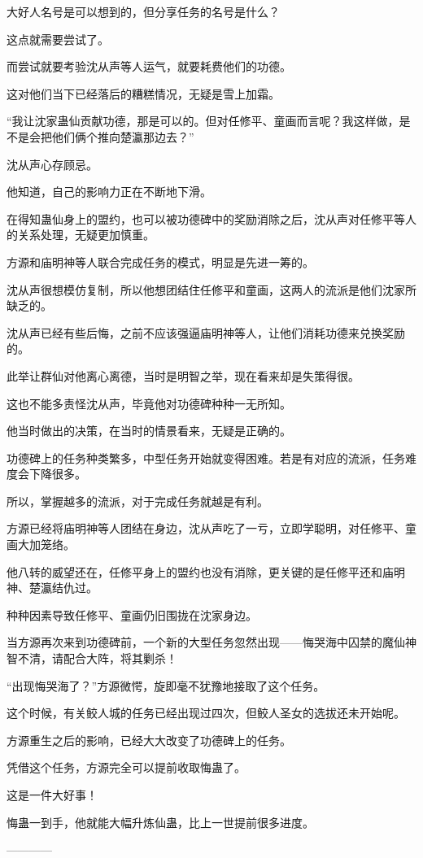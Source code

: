 \begin{this_body}
大好人名号是可以想到的，但分享任务的名号是什么？

这点就需要尝试了。

而尝试就要考验沈从声等人运气，就要耗费他们的功德。

这对他们当下已经落后的糟糕情况，无疑是雪上加霜。

“我让沈家蛊仙贡献功德，那是可以的。但对任修平、童画而言呢？我这样做，是不是会把他们俩个推向楚瀛那边去？”

沈从声心存顾忌。

他知道，自己的影响力正在不断地下滑。

在得知蛊仙身上的盟约，也可以被功德碑中的奖励消除之后，沈从声对任修平等人的关系处理，无疑更加慎重。

方源和庙明神等人联合完成任务的模式，明显是先进一筹的。

沈从声很想模仿复制，所以他想团结住任修平和童画，这两人的流派是他们沈家所缺乏的。

沈从声已经有些后悔，之前不应该强逼庙明神等人，让他们消耗功德来兑换奖励的。

此举让群仙对他离心离德，当时是明智之举，现在看来却是失策得很。

这也不能多责怪沈从声，毕竟他对功德碑种种一无所知。

他当时做出的决策，在当时的情景看来，无疑是正确的。

功德碑上的任务种类繁多，中型任务开始就变得困难。若是有对应的流派，任务难度会下降很多。

所以，掌握越多的流派，对于完成任务就越是有利。

方源已经将庙明神等人团结在身边，沈从声吃了一亏，立即学聪明，对任修平、童画大加笼络。

他八转的威望还在，任修平身上的盟约也没有消除，更关键的是任修平还和庙明神、楚瀛结仇过。

种种因素导致任修平、童画仍旧围拢在沈家身边。

当方源再次来到功德碑前，一个新的大型任务忽然出现——悔哭海中囚禁的魔仙神智不清，请配合大阵，将其剿杀！

“出现悔哭海了？”方源微愕，旋即毫不犹豫地接取了这个任务。

这个时候，有关鲛人城的任务已经出现过四次，但鲛人圣女的选拔还未开始呢。

方源重生之后的影响，已经大大改变了功德碑上的任务。

凭借这个任务，方源完全可以提前收取悔蛊了。

这是一件大好事！

悔蛊一到手，他就能大幅升炼仙蛊，比上一世提前很多进度。

------------

\end{this_body}

